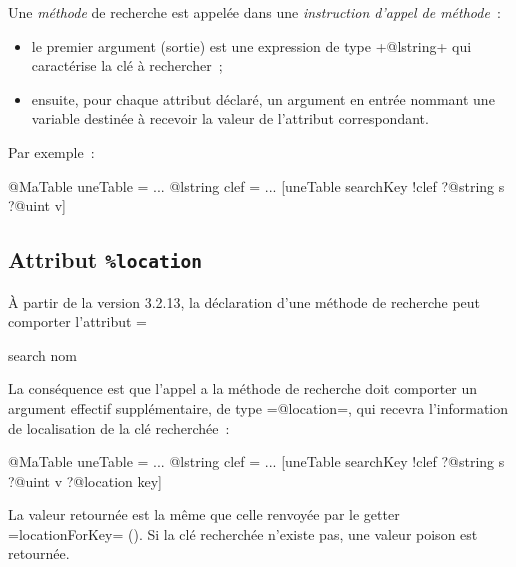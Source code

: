 Une \emph{méthode} de recherche est appelée dans une \emph{instruction d'appel de méthode}~:
\begin{itemize}
  \item le premier argument (sortie) est une expression de type \ggs+@lstring+ qui caractérise la clé à rechercher~;
  \item ensuite, pour chaque attribut déclaré, un argument en entrée nommant une variable destinée à recevoir la valeur de l'attribut correspondant.
\end{itemize}

Par exemple~:
\begin{galgas}
@MaTable uneTable = {}
...
@lstring clef = ...
[uneTable searchKey !clef ?@string s ?@uint v]
\end{galgas}


\subsection{Attribut \texttt{\%location}}

À partir de la version 3.2.13, la déclaration d'une méthode de recherche peut comporter l'attribut \ggs=%

\begin{galgas}
search nom %
\end{galgas}

La conséquence est que l'appel a la méthode de recherche doit comporter un argument effectif supplémentaire, de type \ggs=@location=, qui recevra l'information de localisation de la clé recherchée~:

\begin{galgas}
@MaTable uneTable = {}
...
@lstring clef = ...
[uneTable searchKey !clef ?@string s ?@uint v ?@location key]
\end{galgas}

La valeur retournée est la même que celle renvoyée par le getter \ggs=locationForKey= (). Si la clé recherchée n'existe pas, une valeur poison est retournée.







